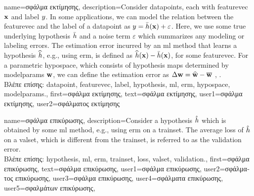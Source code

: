 {name={\foreignlanguage{greek}{σφάλμα εκτίμησης}},
	description={Consider \gls{datapoint}s, each with \gls{featurevec} ${\bf x}$ and \gls{label} 
		$y$. In some applications, we can model the relation between the \gls{featurevec} and the \gls{label}
		of a \gls{datapoint} as $y = \bar{h}({\bf x}) + \varepsilon$. Here, we 
		use some true underlying \gls{hypothesis} $\bar{h}$ and a noise term $\varepsilon$ 
		which summarizes any modeling or labeling errors. The estimation error incurred by an \gls{ml} 
		method that learns a \gls{hypothesis} $\widehat{h}$, e.g., using \gls{erm}, is defined as 
		$\widehat{h}({\bf x}) - \bar{h}({\bf x})$, for some \gls{featurevec}. 
		For a parametric \gls{hypospace}, which consists of \gls{hypothesis} maps determined by 
		\gls{modelparams} ${\bf w}$, we can define the estimation error as $\Delta {\bf w} = \widehat{{\bf w}} - \overline{{\bf w}}$ \cite{kay}, \cite{hastie01statisticallearning}.\\
		\foreignlanguage{greek}{Βλέπε επίσης:} \gls{datapoint}, \gls{featurevec}, \gls{label}, \gls{hypothesis}, \gls{ml}, \gls{erm}, \gls{hypospace}, \gls{modelparams}.},
	first={\foreignlanguage{greek}{σφάλμα εκτίμησης}},
	text={\foreignlanguage{greek}{σφάλμα εκτίμησης}},
	user1={\foreignlanguage{greek}{σφάλμα εκτίμησης}}, %
    	user2={\foreignlanguage{greek}{σφάλματος εκτίμησης}} %
}

{name={\foreignlanguage{greek}{σφάλμα επικύρωσης}},
	description={Consider a \gls{hypothesis} $\hat{h}$ which is 
 		obtained by some \gls{ml} method, e.g., using \gls{erm} on a \gls{trainset}. The average \gls{loss} 
 		of $\hat{h}$ on a \gls{valset}, which is different from the \gls{trainset}, is referred 
 		to as the \gls{validation} error.\\
	\foreignlanguage{greek}{Βλέπε επίσης:} \gls{hypothesis}, \gls{ml}, \gls{erm}, \gls{trainset}, \gls{loss}, \gls{valset}, \gls{validation}.},
	first={\foreignlanguage{greek}{σφάλμα επικύρωσης}},
	text={\foreignlanguage{greek}{σφάλμα επικύρωσης}},
	user1={\foreignlanguage{greek}{σφάλμα επικύρωσης}}, %
	user2={\foreignlanguage{greek}{σφάλματος επικύρωσης}}, %
	user3={\foreignlanguage{greek}{σφάλμα επικύρωσης}}, %
	user4={\foreignlanguage{greek}{σφάλματα επικύρωσης}}, %
	user5={\foreignlanguage{greek}{σφαλμάτων επικύρωσης}}, %
}


